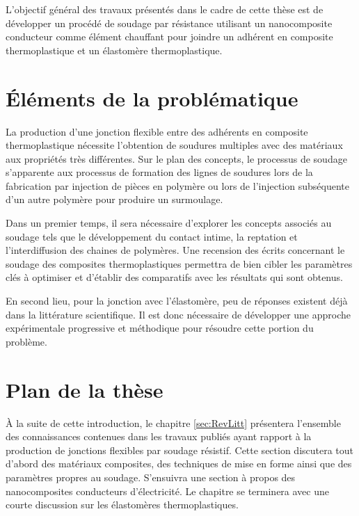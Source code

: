 L'objectif général des travaux présentés dans le cadre de cette thèse est de développer un procédé de soudage par résistance utilisant un nanocomposite conducteur comme élément chauffant pour joindre un adhérent en composite thermoplastique et un élastomère thermoplastique. 



\section{Éléments de la problématique}

La production d'une jonction flexible entre des adhérents en composite thermoplastique nécessite l'obtention de soudures multiples avec des matériaux aux propriétés très différentes. 
Sur le plan des concepts, le processus de soudage s'apparente aux processus de formation des lignes de soudures lors de la fabrication par injection de pièces en polymère ou lors de l'injection subséquente d'un autre polymère pour produire un surmoulage. 

Dans un premier temps, il sera nécessaire d'explorer les concepts associés au soudage tels que le développement du contact intime, la reptation et l'interdiffusion des chaines de polymères. 
Une recension des écrits concernant le soudage des composites thermoplastiques permettra de bien cibler les paramètres clés à optimiser et d'établir des comparatifs avec les résultats qui sont obtenus. 

En second lieu, pour la jonction avec l'élastomère, peu de réponses existent déjà dans la littérature scientifique.
Il est donc nécessaire de développer une approche expérimentale progressive et méthodique pour résoudre cette portion du problème. 

\section{Plan de la thèse}  %

À la suite de cette introduction, le chapitre \ref{sec:RevLitt} présentera l'ensemble des connaissances contenues dans les travaux publiés ayant rapport à la production de jonctions flexibles par soudage résistif. 
Cette section discutera tout d'abord des matériaux composites, des techniques de mise en forme ainsi que des paramètres propres au soudage. S'ensuivra une section à propos des nanocomposites conducteurs d'électricité. Le chapitre se terminera avec une courte discussion sur les élastomères thermoplastiques.

